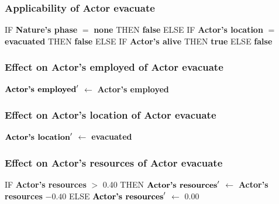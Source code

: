 \documentclass{article}%
\begin{document}
\subsubsection{Applicability of Actor evacuate}%
\label{ssubsec:Applicability of Actor evacuate}%
\begin{flushleft}%
IF %
\textbf{Nature's phase}%
$=$%
\textbf{none}%
\linebreak%
\hspace*{2em}%
THEN %
\textbf{false}%
\linebreak%
\hspace*{2em}%
ELSE %
IF %
\textbf{Actor's location}%
$=$%
\textbf{evacuated}%
\linebreak%
\hspace*{4em}%
THEN %
\textbf{false}%
\linebreak%
\hspace*{4em}%
ELSE %
IF %
\textbf{Actor's alive}%
\linebreak%
\hspace*{6em}%
THEN %
\textbf{true}%
\linebreak%
\hspace*{6em}%
ELSE %
\textbf{false}%
\end{flushleft}

%
\subsubsection{Effect on Actor's employed of Actor evacuate}%
\label{ssubsec:Effect on Actor's employed of Actor evacuate}%
\begin{flushleft}%
$\mbox{\textbf{Actor's employed}} '$%
$\leftarrow$%
\textbf{Actor's employed}%
\end{flushleft}

%
\subsubsection{Effect on Actor's location of Actor evacuate}%
\label{ssubsec:Effect on Actor's location of Actor evacuate}%
\begin{flushleft}%
$\mbox{\textbf{Actor's location}} '$%
$\leftarrow$%
\textbf{evacuated}%
\end{flushleft}

%
\subsubsection{Effect on Actor's resources of Actor evacuate}%
\label{ssubsec:Effect on Actor's resources of Actor evacuate}%
\begin{flushleft}%
IF %
\textbf{Actor's resources}%
$>$%
0.40%
\linebreak%
\hspace*{2em}%
THEN %
$\mbox{\textbf{Actor's resources}} '$%
$\leftarrow$%
\textbf{Actor's resources}%
${-}0.40$%
\linebreak%
\hspace*{2em}%
ELSE %
$\mbox{\textbf{Actor's resources}} '$%
$\leftarrow$%
0.00%
\end{flushleft}
\end{document}

